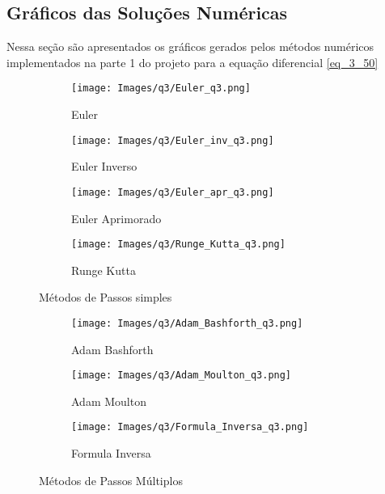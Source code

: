 \documentclass[12pt]{article}
\begin{document}
\subsection{Gráficos das Soluções Numéricas}

Nessa seção são apresentados os gráficos gerados pelos métodos numéricos implementados na parte 1 do projeto para a equação diferencial \ref{eq_3_50}
\begin{figure}[H]
\begin{subfigure}{.5\textwidth}
  \centering
  \texttt{[image: Images/q3/Euler\_q3.png]}  
  \caption{Euler}
\end{subfigure}
\begin{subfigure}{.5\textwidth}
  \centering
  \texttt{[image: Images/q3/Euler\_inv\_q3.png]}  
  \caption{Euler Inverso}
\end{subfigure}

\newline

\begin{subfigure}{.5\textwidth}
  \centering
  \texttt{[image: Images/q3/Euler\_apr\_q3.png]}  
  \caption{Euler Aprimorado}
\end{subfigure}
\begin{subfigure}{.5\textwidth}
  \centering
  \texttt{[image: Images/q3/Runge\_Kutta\_q3.png]}  
  \caption{Runge Kutta}
\end{subfigure}
\caption{Métodos de Passos simples}
\end{figure}

\begin{figure}[H]
\begin{subfigure}{.5\textwidth}
  \centering
  \texttt{[image: Images/q3/Adam\_Bashforth\_q3.png]}  
  \caption{Adam Bashforth}
\end{subfigure}
\begin{subfigure}{.5\textwidth}
  \centering
  \texttt{[image: Images/q3/Adam\_Moulton\_q3.png]}  
  \caption{Adam Moulton}
\end{subfigure}

\newline

\begin{subfigure}{.5\textwidth}
  \centering
  \texttt{[image: Images/q3/Formula\_Inversa\_q3.png]}  
  \caption{Formula Inversa}
\end{subfigure}
\caption{Métodos de Passos Múltiplos}
\end{figure}
\end{document}
